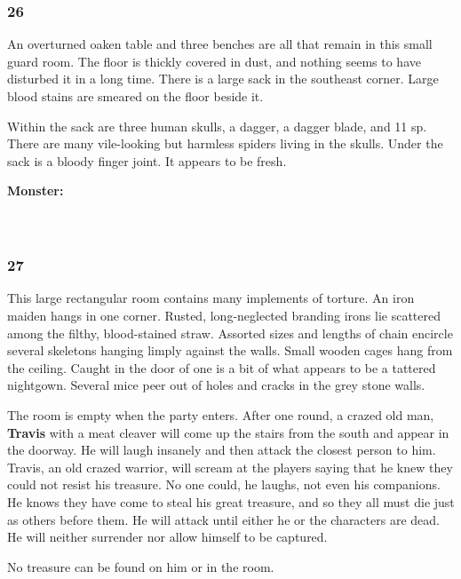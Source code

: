 \documentclass[palace_of_the_silver_princess]{subfiles}
\begin{document}
\subsubsection{26}
\begin{quotebox}
    An overturned oaken table and three benches are all that remain in
    this small guard room. The floor is thickly covered in dust, and
    nothing seems to have disturbed it in a long time. There is a large
    sack in the southeast corner. Large blood stains are smeared on the
    floor beside it.
\end{quotebox}

Within the sack are three human skulls, a dagger, a dagger blade, and 11
sp. There are many vile-looking but harmless spiders living in the
skulls. Under the sack is a bloody finger joint. It appears to be fresh.

\textbf{Monster:}
\\
\\
\\

\subsubsection{27}
\begin{quotebox}
    This large rectangular room contains many implements of torture.
    An iron maiden hangs in one corner. Rusted, long-neglected
    branding irons lie scattered among the filthy, blood-stained straw.
    Assorted sizes and lengths of chain encircle several skeletons
    hanging limply against the walls. Small wooden cages hang from the
    ceiling. Caught in the door of one is a bit of what appears to be a
    tattered nightgown. Several mice peer out of holes and cracks in the
    grey stone walls.
\end{quotebox}

The room is empty when the party enters. After one round, a crazed old
man, \textbf{Travis} with a meat cleaver will come up the stairs from
the south and appear in the doorway. He will laugh insanely and then
attack the closest person to him. Travis, an old crazed warrior, will
scream at the players saying that he knew they could not resist his
treasure. No one could, he laughs, not even his companions. He knows
they have come to steal his great treasure, and so they all must die
just as others before them. He will attack until either he or the
characters are dead. He will neither surrender nor allow himself to be
captured.

No treasure can be found on him or in the room.
\end{document}
